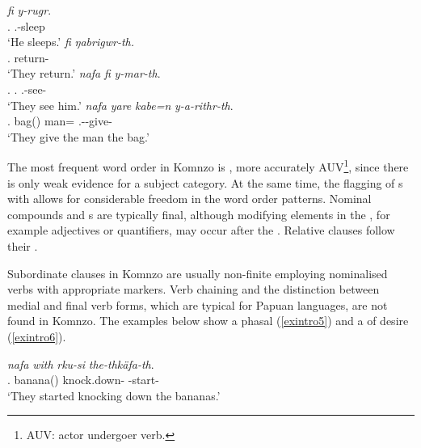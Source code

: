 \begin{exe}
\ex
\label{exintro4}
\begin{xlist}
	\ex %
	\gll \emph{fi} \emph{y-rugr}.\\
	\Third.\Abs{} \Tsg.\Masc-sleep\\
	\trans `He sleeps.'
	\ex %
	\gll \emph{fi} \emph{ŋabrigwr-th.}\\
	\Third.\Abs{} return-\Tpl\\
	\trans `They return.'
	\ex %
	\gll \emph{nafa} \emph{fi} \emph{y-mar-th}.\\
	\Tpl{}.\Erg{} \Third.\Abs{} \Tsg.\Masc-see-\Tpl{}\\
	\trans `They see him.'
	\ex
	\gll \emph{nafa} \emph{yare} \emph{kabe=n} \emph{y-a-rithr-th}.\\
	\Tpl{}.\Erg{} bag(\Abs) man=\Dat{} \Tsg.\Masc-\Vc-give-\Tpl{}\\
	\trans `They give the man the bag.'
\end{xlist}
\end{exe}

The most frequent word order in Komnzo is , more accurately AUV\footnote{AUV: actor undergoer verb.}, since there is only weak evidence for a subject category. At the same time, the flagging of s with  allows for considerable freedom in the word order patterns. Nominal compounds and s are typically  final, although modifying elements in the , for example adjectives or quantifiers, may occur after the . Relative clauses follow their .%

Subordinate clauses in Komnzo are usually non-finite employing nominalised verbs with appropriate  markers. Verb chaining and the distinction between medial and final verb forms, which are typical for Papuan languages, are not found in Komnzo. The examples below show a phasal  (\ref{exintro5}) and a  of desire (\ref{exintro6}).

\begin{exe}
	\ex
	\gll \emph{nafa} \emph{with} \emph{rku-si} \emph{the-thkäfa-th}.\\
	\Tnsg.\Erg{} banana({\Abs}) knock.down-\Nmlz{} \Stpl-start-\Stsg\\
	\trans `They started knocking down the bananas.'
	\label{exintro5}
\end{exe}

